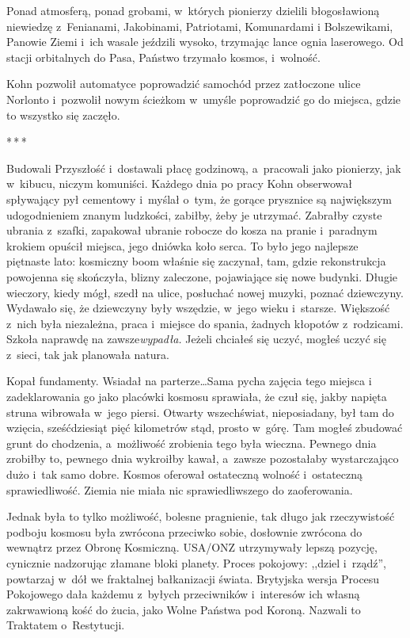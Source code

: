 \documentclass[oneside,polish,11pt,sfheadings]{mwbk}
\newcommand{\threeast}{\bigskip\par\centerline{*\,*\,*}\medskip\par}%
\begin{document}
Ponad atmosferą, ponad grobami, w~których pionierzy dzielili
błogosławioną niewiedzę z~Fenianami, Jakobinami, Patriotami, Komunardami
i Bolszewikami, Panowie Ziemi i~ich wasale jeździli wysoko, trzymając
lance ognia laserowego. Od stacji orbitalnych do Pasa, Państwo trzymało
kosmos, i~wolność.

Kohn pozwolił automatyce poprowadzić samochód przez zatłoczone ulice
Norlonto i~pozwolił nowym ścieżkom w~umyśle poprowadzić go do miejsca,
gdzie to wszystko się zaczęło.

  \threeast 

Budowali Przyszłość i~dostawali płacę godzinową, a~pracowali jako
pionierzy, jak w~kibucu, niczym komuniści. Każdego dnia po pracy Kohn
obserwował spływający pył cementowy i~myślał o~tym, że gorące prysznice
są największym udogodnieniem znanym ludzkości, zabiłby, żeby je
utrzymać. Zabrałby czyste ubrania z~szafki, zapakował ubranie robocze
do kosza na pranie i~paradnym krokiem opuścił miejsca, jego dniówka koło
serca. To było jego najlepsze piętnaste lato: kosmiczny boom właśnie się
zaczynał, tam, gdzie rekonstrukcja powojenna się skończyła, blizny
zaleczone, pojawiające się nowe budynki. Długie wieczory, kiedy mógł,
szedł na ulice, posłuchać nowej muzyki, poznać dziewczyny. Wydawało się,
że dziewczyny były wszędzie, w~jego wieku i~starsze. Większość z~nich
była niezależna, praca i~miejsce do spania, żadnych kłopotów z~rodzicami. Szkoła naprawdę na zawsze\emph{wypadła.} Jeżeli chciałeś się
uczyć, mogłeś uczyć się z~sieci, tak jak planowała natura.

Kopał fundamenty. Wsiadał na parterze\ldots Sama pycha zajęcia tego miejsca
i zadeklarowania go jako placówki kosmosu sprawiała, że czuł się, jakby
napięta struna wibrowała w~jego piersi. Otwarty wszechświat,
nieposiadany, był tam do wzięcia, sześćdziesiąt pięć kilometrów stąd,
prosto w~górę. Tam mogłeś zbudować grunt do chodzenia, a~możliwość
zrobienia tego była wieczna. Pewnego dnia zrobiłby to, pewnego dnia
wykroiłby kawał, a~zawsze pozostałaby wystarczająco dużo i~tak samo
dobre. Kosmos oferował ostateczną wolność i~ostateczną sprawiedliwość.
Ziemia nie miała nic sprawiedliwszego do zaoferowania.

Jednak była to tylko możliwość, bolesne pragnienie, tak długo jak
rzeczywistość podboju kosmosu była zwrócona przeciwko sobie, dosłownie
zwrócona do wewnątrz przez Obronę Kosmiczną. USA/ONZ utrzymywały lepszą
pozycję, cynicznie nadzorując złamane bloki planety. Proces pokojowy:
,,dziel i~rządź'', powtarzaj w~dół we fraktalnej bałkanizacji świata.
Brytyjska wersja Procesu Pokojowego dała każdemu z~byłych przeciwników i~interesów ich własną zakrwawioną kość do żucia, jako Wolne Państwa pod
Koroną. Nazwali to Traktatem o~Restytucji.
\end{document}
